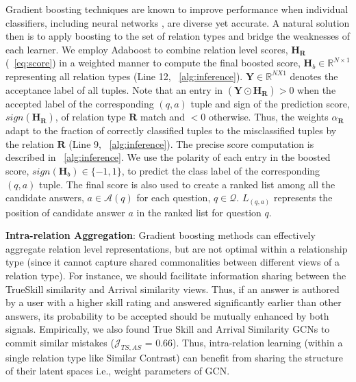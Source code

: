 Gradient boosting techniques are known to improve performance when individual classifiers, including neural networks \cite{ncboost}, are diverse yet accurate. A natural solution then is to apply boosting to the set of relation types and bridge the weaknesses of each learner. We employ Adaboost \cite{adaboost} to combine relation level scores, $\mathbf{H}_{\mathbf{R}}$ (~\cref{eq:score}) in a weighted manner to compute the final boosted score, $\mathbf{H}_b \in \mathbb{R}^{N \times 1}$ representing all relation types (Line 12, ~\cref{alg:inference}). $\mathbf{Y} \in \mathbb{R}^{N X 1}$ denotes the acceptance label of all tuples. Note that an entry in $(\mathbf{Y} \odot \mathbf{H_{\mathbf{R}}}) > 0 $ when the accepted label of the corresponding $(q,a)$ tuple and sign of the prediction score, $sign(\mathbf{H_{\mathbf{R}}})$, of relation type $\mathbf{R}$ match and $< 0$ otherwise. Thus, the weights $\alpha_\mathbf{R}$ adapt to the fraction of correctly classified tuples to the misclassified tuples by the relation $\mathbf{R}$ (Line 9, ~\cref{alg:inference}).
The precise score computation is described in ~\cref{alg:inference}. We use the polarity of each entry in the boosted score, $sign(\mathbf{H}_b) \in \{-1,1 \}$, to predict the class label of the corresponding $(q,a)$ tuple. The final score is also used to create a ranked list among all the candidate answers, $a \in \mathcal{A}(q)$ for each question, $q \in \mathcal{Q}$. $L_{(q,a)}$ represents the position of candidate answer $a$ in the ranked list for question $q$.

\noindent
\textbf{Intra-relation Aggregation}: Gradient boosting methods can effectively aggregate relation level representations, but are not optimal within a relationship type (since it cannot capture shared commonalities between different views of a relation type). For instance, we should facilitate information sharing between the TrueSkill similarity and Arrival similarity views. Thus, if an answer is authored by a user with a higher skill rating and answered significantly earlier than other answers, its probability to be accepted should be mutually enhanced by both signals. Empirically, we also found True Skill and Arrival Similarity GCNs to commit similar mistakes ($\mathcal{J}_{TS,AS}$ = 0.66). Thus, intra-relation learning (within a single relation type like Similar Contrast) can benefit from sharing the structure of their latent spaces i.e., weight parameters of GCN.

